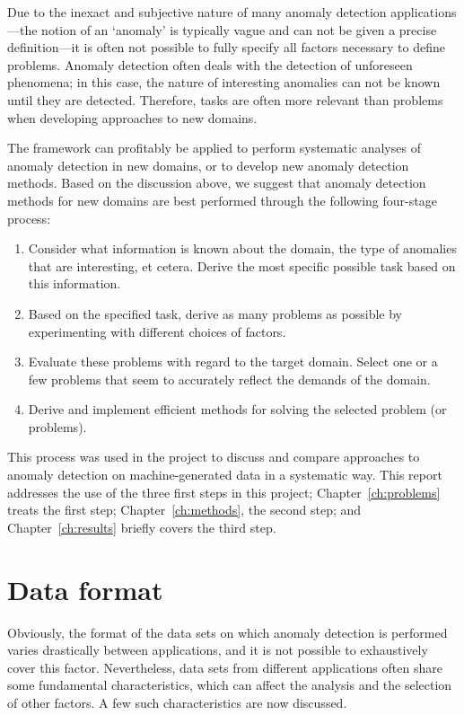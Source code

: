 Due to the inexact and subjective nature of many anomaly detection applications---the notion of an `anomaly' is typically vague and can not be given a precise definition---it is often not possible to fully specify all factors necessary to define problems. Anomaly detection often deals with the detection of unforeseen phenomena; in this case, the nature of interesting anomalies can not be known until they are detected. Therefore, tasks are often more relevant than problems when developing approaches to new domains.

The framework can profitably be applied to perform systematic analyses of anomaly detection in new domains, or to develop new anomaly detection methods. Based on the discussion above, we suggest that anomaly detection methods for new domains are best performed through the following four-stage process:
\begin{enumerate}
  \item Consider what information is known about the domain, the type of anomalies that are interesting, et cetera. Derive the most specific possible task based on this information.
  \item Based on the specified task, derive as many problems as possible by experimenting with different choices of factors.
  \item Evaluate these problems with regard to the target domain. Select one or a few problems that seem to accurately reflect the demands of the domain.
  \item Derive and implement efficient methods for solving the selected problem (or problems).
\end{enumerate}

This process was used in the project to discuss and compare approaches to anomaly detection on machine-generated data in a systematic way. This report addresses the use of the three first steps in this project; Chapter~\ref{ch:problems} treats the first step; Chapter~\ref{ch:methods}, the second step; and Chapter~\ref{ch:results} briefly covers the third step.


\section{Data format}
\label{sect:data_format}

Obviously, the format of the data sets on which anomaly detection is performed varies drastically between applications, and it is not possible to exhaustively cover this factor. Nevertheless, data sets from different applications often share some fundamental characteristics, which can affect the analysis and the selection of other factors. A few such characteristics are now discussed.

